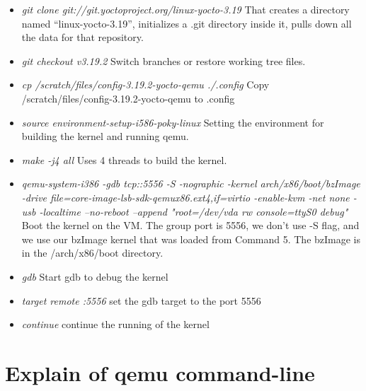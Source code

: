 \documentclass[10pt,draftclsnofoot,peerreview,letterpaper,onecolumn,]{IEEEtran}
\begin{document}
\begin{itemize}
\item \emph{git clone git://git.yoctoproject.org/linux-yocto-3.19} That creates a directory named “linux-yocto-3.19”, initializes a .git directory inside it, pulls down all the data for that repository.
\item \emph{git checkout v3.19.2} Switch branches or restore working tree files.
\item \emph{cp /scratch/files/config-3.19.2-yocto-qemu ./.config} Copy /scratch/files/config-3.19.2-yocto-qemu to .config
\item \emph{source environment-setup-i586-poky-linux} Setting the environment for building the kernel and running qemu.
\item \emph{make -j4 all} Uses 4 threads to build the kernel.
\item \emph{qemu-system-i386 -gdb tcp::5556 -S -nographic -kernel arch/x86/boot/bzImage -drive file=core-image-lsb-sdk-qemux86.ext4,if=virtio -enable-kvm -net none -usb -localtime --no-reboot --append "root=/dev/vda rw console=ttyS0 debug"} Boot the kernel on the VM. The group port is 5556, we don't use -S flag, and we use our bzImage kernel that was loaded from Command 5. The bzImage is in the /arch/x86/boot directory.
\item \emph{gdb} Start gdb to debug the kernel
\item \emph{target remote :5556} set the gdb target to the port 5556
\item \emph{continue} continue the running of the kernel
\end{itemize}

\section{Explain of qemu command-line}
\end{document}
